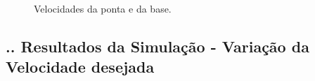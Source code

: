 \documentclass[aspectratio=169]{beamer}
\begin{document}
\begin{frame}
  \frametitle{\insertsubsection}
  \begin{figure}[H]
    \centering
    \caption{Velocidades da ponta e da base.}
    \hfill
    \label{fig:ref_vel}
  \end{figure}
\end{frame}

\subsection{\insertsectionnumber .\insertsubsectionnumber . Resultados da Simulação - Variação da Velocidade desejada}
\end{document}
